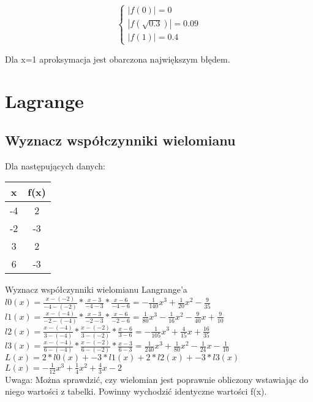 \documentclass{article}
\begin{document}
\begin{equation*}\begin{cases}
    |f(0)| = 0\\
    |f(\sqrt{0.3})|=0.09\\
    |f(1)| = 0.4
\end{cases}\end{equation*}

Dla x=1 aproksymacja jest obarczona największym błędem.

\section{Lagrange}
\subsection{Wyznacz współczynniki wielomianu}
Dla następujących danych:
\begin{table}[H]
\begin{tabular}{|c|c|}
\hline
x  & f(x) \\ \hline
-4 & 2    \\ \hline
-2 & -3   \\ \hline
3  & 2    \\ \hline
6  & -3   \\ \hline
\end{tabular}
\end{table}
Wyznacz współczynniki wielomianu Langrange'a\\
$l0(x)=\frac{x- (-2)}{-4- (-2)}*\frac{x-3}{-4-3}*\frac{x-6}{-4-6} = -\frac{1}{140}x^3+\frac{1}{20}x^2-\frac{9}{35}$\\ %
$l1(x)=\frac{x- (-4)}{-2- (-4)}*\frac{x-3}{-2-3}*\frac{x-6}{-2-6} = \frac{1}{80}x^3-\frac{1}{16}x^2-\frac{9}{40}x+\frac{9}{10}$\\ %
$l2(x)=\frac{x- (-4)}{3- (-4)}*\frac{x- (-2)}{3- (-2)}*\frac{x-6}{3-6} = -\frac{1}{105}x^3+\frac{4}{15}x+\frac{16}{35}$\\ %
$l3(x)=\frac{x- (-4)}{6- (-4)}*\frac{x- (-2)}{6- (-2)}*\frac{x-3}{6-3} = \frac{1}{240}x^3+\frac{1}{80}x^2-\frac{1}{24}x-\frac{1}{10}$\\ %
$L(x)=2*l0(x)+-3*l1(x)+2*l2(x)+-3*l3(x)$\\
$L(x)=-\frac{1}{12}x^3+\frac{1}{4}x^2+\frac{4}{3}x-2$\\
Uwaga: Można sprawdzić, czy wielomian jest poprawnie obliczony wstawiając do niego wartości z tabelki. Powinny wychodzić identyczne wartości f(x).
\end{document}

